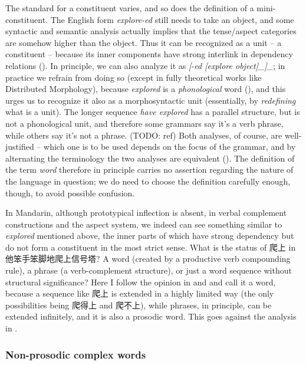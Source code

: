 \documentclass[UTF8, a4paper, oneside, scheme=plain]{ctexrep}
\newcommand*{\citesec}[1]{\S~{#1}}
\newcommand*{\citepage}[1]{p.~{#1}}
\newcommand*{\term}[1]{\emph{#1}}
\newcommand{\corpus}[1]{\emph{#1}}
\begin{document}
The standard for a constituent varies,
and so does the definition of a mini-constituent.
The English form \corpus{explore-ed} 
still needs to take an object, 
and some syntactic and semantic analysis 
actually implies that the tense/aspect categories are somehow higher than the object.
Thus it can be recognized as a unit -- a constituent -- because 
its inner components have strong interlink in dependency relations
().
In principle, we can also analyze it as 
\corpus{[-ed [explore \emph{object}]_{}]_{\text{\acs{tame} marking}}};
in practice we refrain from doing so
(except in fully theoretical works like Distributed Morphology), 
because \corpus{explored} is a \emph{phonological} word 
(),
and this urges us to recognize it also as a morphosyntactic unit
(essentially, by \emph{redefining} what is a unit).
The longer sequence \corpus{have explored} 
has a parallel structure, 
but is not a phonological unit, 
and therefore some grammars say it's a verb phrase,
while others say it's not a phrase. (TODO: ref)
Both analyses, of course, are well-justified -- 
which one is to be used 
depends on the focus of the grammar,
and by alternating the terminology 
the two analyses are equivalent
().
The definition of the term \term{word} 
therefore in principle carries no assertion regarding 
the nature of the language in question; 
we do need to choose the definition carefully enough, though, 
to avoid possible confusion.

In Mandarin, although prototypical inflection is absent, 
in verbal complement constructions 
and the aspect system, 
we indeed can see something similar to \corpus{explored} mentioned above, 
the inner parts of which have strong dependency
but do not form a constituent in the most strict sense.
What is the status of 爬上 in 他笨手笨脚地爬上信号塔?
A word (created by a productive verb compounding rule), 
a phrase (a verb-complement structure),
or just a word sequence without structural significance?
Here I follow the opinion in \citep[\citepage{86}]{feng2000} and \citet{tham2015resultative}
and call it a word,
because a sequence like 爬上 is extended in a highly limited way 
(the only possibilities being 爬得上 and 爬不上),
while phrases, in principle, can be extended infinitely, 
and it is also a prosodic word.
This goes against the analysis in \citep[\citesec{1.2.7}]{zhudexigrammar}.


\subsubsection{Non-prosodic complex words}\label{sec:pos.word.complex}
\end{document}
